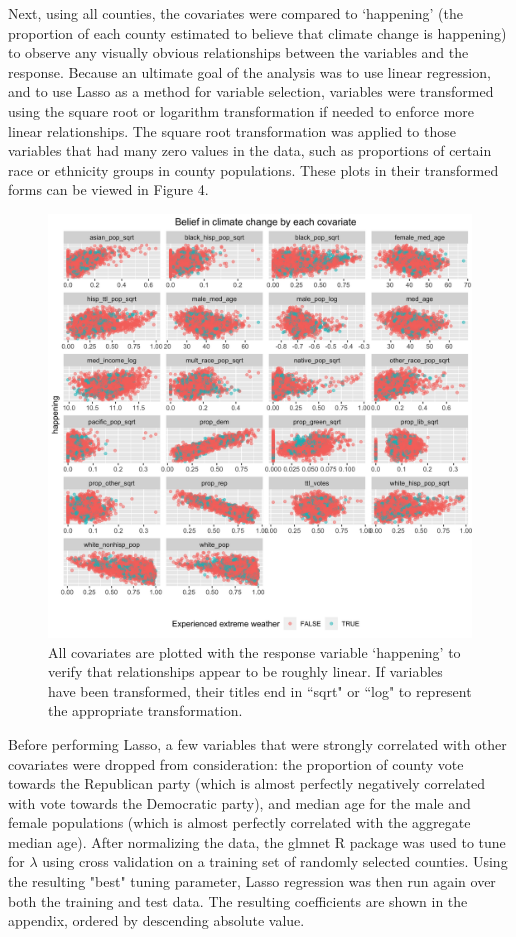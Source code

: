 \documentclass{article}
\begin{document}
Next, using all counties, the covariates were compared to `happening' (the proportion of each county estimated to believe that climate change is happening) to observe any visually obvious relationships between the variables and the response. Because an ultimate goal of the analysis was to use linear regression, and to use Lasso as a method for variable selection, variables were transformed using the square root or logarithm transformation if needed to enforce more linear relationships. The square root transformation was applied to those variables that had many zero values in the data, such as proportions of certain race or ethnicity groups in county populations. These plots in their transformed forms can be viewed in Figure 4.

\begin{figure}[H]
\centering
\includegraphics[scale=0.2]{images/covariates_vs_happening.png}
\caption{All covariates are plotted with the response variable `happening' to verify that relationships appear to be roughly linear. If variables have been transformed, their titles end in ``sqrt" or ``log" to represent the appropriate transformation.}
\end{figure}

Before performing Lasso, a few variables that were strongly correlated with other covariates were dropped from consideration: the proportion of county vote towards the Republican party (which is almost perfectly negatively correlated with vote towards the Democratic party), and median age for the male and female populations (which is almost perfectly correlated with the aggregate median age). After normalizing the data, the glmnet R package was used to tune for $\lambda$ using cross validation on a training set of randomly selected counties. Using the resulting "best" tuning parameter, Lasso regression was then run again over both the training and test data. The resulting coefficients are shown in the appendix, ordered by descending absolute value. 
\end{document}
